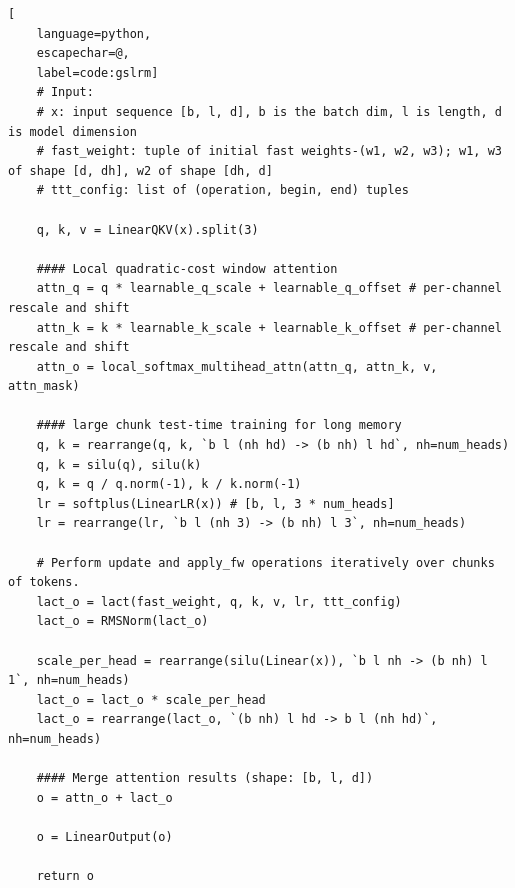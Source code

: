 \begin{algorithm}[t]

\caption{LaCT Layer with In-Layer Hybrid Window Attention Pseudocode}\label{alg:lact_hybrid}
\newcommand{\hlbox}[1]{%
  \fboxsep=1.2pt\hspace*{-\fboxsep}\colorbox{blue!10}{\detokenize{#1}}%
}
\lstset{style=mocov3}
\begin{lstlisting}[
    language=python,
    escapechar=@,
    label=code:gslrm]
    # Input: 
    # x: input sequence [b, l, d], b is the batch dim, l is length, d is model dimension
    # fast_weight: tuple of initial fast weights-(w1, w2, w3); w1, w3 of shape [d, dh], w2 of shape [dh, d]
    # ttt_config: list of (operation, begin, end) tuples

    q, k, v = LinearQKV(x).split(3)
    
    #### Local quadratic-cost window attention
    attn_q = q * learnable_q_scale + learnable_q_offset # per-channel rescale and shift
    attn_k = k * learnable_k_scale + learnable_k_offset # per-channel rescale and shift
    attn_o = local_softmax_multihead_attn(attn_q, attn_k, v, attn_mask)
    
    #### large chunk test-time training for long memory
    q, k = rearrange(q, k, `b l (nh hd) -> (b nh) l hd`, nh=num_heads)
    q, k = silu(q), silu(k)
    q, k = q / q.norm(-1), k / k.norm(-1)
    lr = softplus(LinearLR(x)) # [b, l, 3 * num_heads]
    lr = rearrange(lr, `b l (nh 3) -> (b nh) l 3`, nh=num_heads)

    # Perform update and apply_fw operations iteratively over chunks of tokens.
    lact_o = lact(fast_weight, q, k, v, lr, ttt_config)
    lact_o = RMSNorm(lact_o)
    
    scale_per_head = rearrange(silu(Linear(x)), `b l nh -> (b nh) l 1`, nh=num_heads)
    lact_o = lact_o * scale_per_head
    lact_o = rearrange(lact_o, `(b nh) l hd -> b l (nh hd)`, nh=num_heads)

    #### Merge attention results (shape: [b, l, d])
    o = attn_o + lact_o

    o = LinearOutput(o)

    return o
\end{lstlisting}
\end{algorithm}






